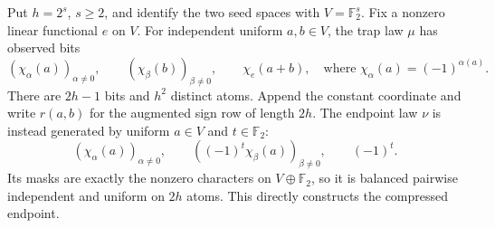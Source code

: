 \documentclass[11pt]{article}
\begin{document}
Put $h=2^s$, $s\ge2$, and identify the two seed spaces with
$V=\mathbb F_2^s$. Fix a nonzero linear functional $e$ on $V$.
For independent uniform $a,b\in V$, the trap law $\mu$ has observed bits
\[
 (\chi_\alpha(a))_{\alpha\ne0},\qquad
 (\chi_\beta(b))_{\beta\ne0},\qquad
 \chi_e(a+b),
 \quad\text{where }\chi_\alpha(a)=(-1)^{\alpha(a)}.
\]
There are $2h-1$ bits and $h^2$ distinct atoms. Append the constant
coordinate and write $r(a,b)$ for the augmented sign row of length $2h$.
The endpoint law $\nu$ is instead generated by uniform $a\in V$ and
$t\in\mathbb F_2$:
\begin{equation}\label{eq:compression-endpoint}
 (\chi_\alpha(a))_{\alpha\ne0},\qquad
 ((-1)^t\chi_\beta(a))_{\beta\ne0},\qquad (-1)^t.
\end{equation}
Its masks are exactly the nonzero characters on $V\oplus\mathbb F_2$,
so it is balanced pairwise independent and uniform on $2h$ atoms.
This directly constructs the compressed endpoint.
\end{document}
